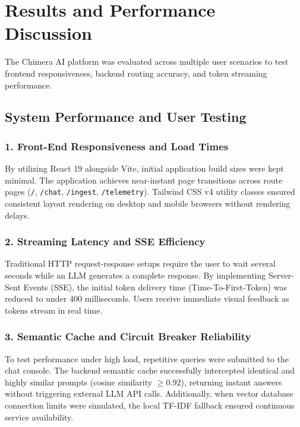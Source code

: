 \chapter{Results and Performance Discussion}

The Chimera AI platform was evaluated across multiple user scenarios to test frontend responsiveness, backend routing accuracy, and token streaming performance.

\section{System Performance and User Testing}

\subsection{1. Front-End Responsiveness and Load Times}
By utilizing React 19 alongside Vite, initial application build sizes were kept minimal. The application achieves near-instant page transitions across route pages (\texttt{/}, \texttt{/chat}, \texttt{/ingest}, \texttt{/telemetry}). Tailwind CSS v4 utility classes ensured consistent layout rendering on desktop and mobile browsers without rendering delays.

\subsection{2. Streaming Latency and SSE Efficiency}
Traditional HTTP request-response setups require the user to wait several seconds while an LLM generates a complete response. By implementing Server-Sent Events (SSE), the initial token delivery time (Time-To-First-Token) was reduced to under 400 milliseconds. Users receive immediate visual feedback as tokens stream in real time.

\subsection{3. Semantic Cache and Circuit Breaker Reliability}
To test performance under high load, repetitive queries were submitted to the chat console. The backend semantic cache successfully intercepted identical and highly similar prompts (cosine similarity $\ge 0.92$), returning instant answers without triggering external LLM API calls. Additionally, when vector database connection limits were simulated, the local TF-IDF fallback ensured continuous service availability.

